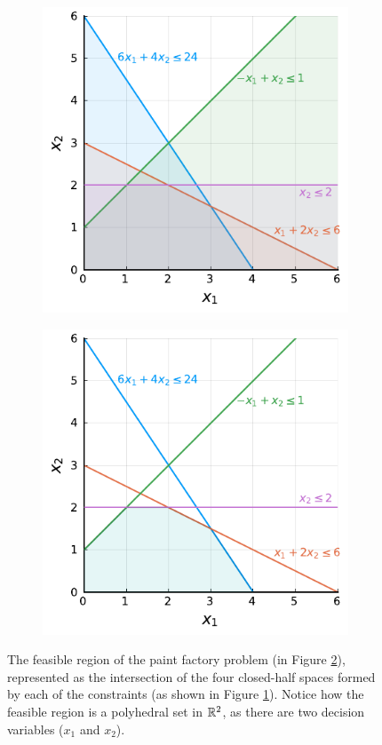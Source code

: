 \begin{figure}[h]
	\begin{subfigure}{0.45\textwidth}
		\includegraphics[scale=0.99]{part_1/chapter_1/figures/figure1-3a.pdf}	
		\caption{} \label{p1c1:fig:fig3a}
	\end{subfigure}
	\begin{subfigure}{0.45\textwidth}
		\includegraphics[scale=0.99]{part_1/chapter_1/figures/figure1-3b.pdf}
		\caption{} \label{p1c1:fig:fig3b}		
	\end{subfigure}
	\caption{The feasible region of the paint factory problem (in Figure \ref{p1c1:fig:fig3b}), represented as the intersection of the four closed-half spaces formed by each of the constraints (as shown in Figure \ref{p1c1:fig:fig3a}). Notice how the feasible region is a polyhedral set in $\mathbb{R}^2$, as there are two decision variables ($x_1$ and $x_2$).} \label{p1c1:fig:feasible_region_plot}	
\end{figure}

